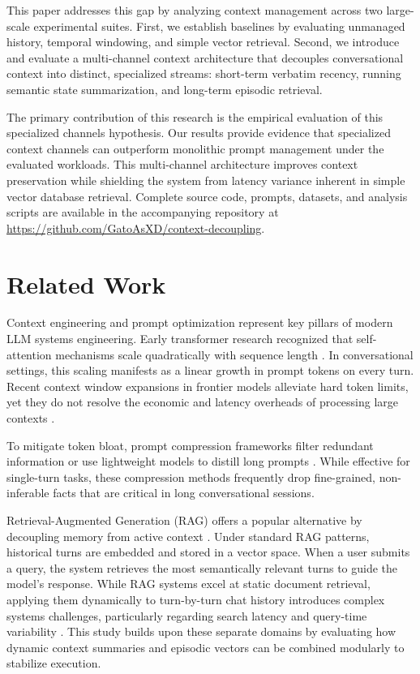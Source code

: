 \documentclass[11pt,journal,onecolumn]{article}
\begin{document}
This paper addresses this gap by analyzing context management across two large-scale experimental suites. First, we establish baselines by evaluating unmanaged history, temporal windowing, and simple vector retrieval. Second, we introduce and evaluate a multi-channel context architecture that decouples conversational context into distinct, specialized streams: short-term verbatim recency, running semantic state summarization, and long-term episodic retrieval.

The primary contribution of this research is the empirical evaluation of this specialized channels hypothesis. Our results provide evidence that specialized context channels can outperform monolithic prompt management under the evaluated workloads. This multi-channel architecture improves context preservation while shielding the system from latency variance inherent in simple vector database retrieval. Complete source code, prompts, datasets, and analysis scripts are available in the accompanying repository at \url{https://github.com/GatoAsXD/context-decoupling}.

\section{Related Work}
Context engineering and prompt optimization represent key pillars of modern LLM systems engineering. Early transformer research recognized that self-attention mechanisms scale quadratically with sequence length \cite{vaswani2017attention}. In conversational settings, this scaling manifests as a linear growth in prompt tokens on every turn. Recent context window expansions in frontier models alleviate hard token limits, yet they do not resolve the economic and latency overheads of processing large contexts \cite{reid2024gemini}.

To mitigate token bloat, prompt compression frameworks filter redundant information or use lightweight models to distill long prompts \cite{jiang2023llmlingua}. While effective for single-turn tasks, these compression methods frequently drop fine-grained, non-inferable facts that are critical in long conversational sessions. 

Retrieval-Augmented Generation (RAG) offers a popular alternative by decoupling memory from active context \cite{lewis2020retrieval, gao2023retrieval}. Under standard RAG patterns, historical turns are embedded and stored in a vector space. When a user submits a query, the system retrieves the most semantically relevant turns to guide the model's response. While RAG systems excel at static document retrieval, applying them dynamically to turn-by-turn chat history introduces complex systems challenges, particularly regarding search latency and query-time variability \cite{ghaffar2024vector}. This study builds upon these separate domains by evaluating how dynamic context summaries and episodic vectors can be combined modularly to stabilize execution.
\end{document}
